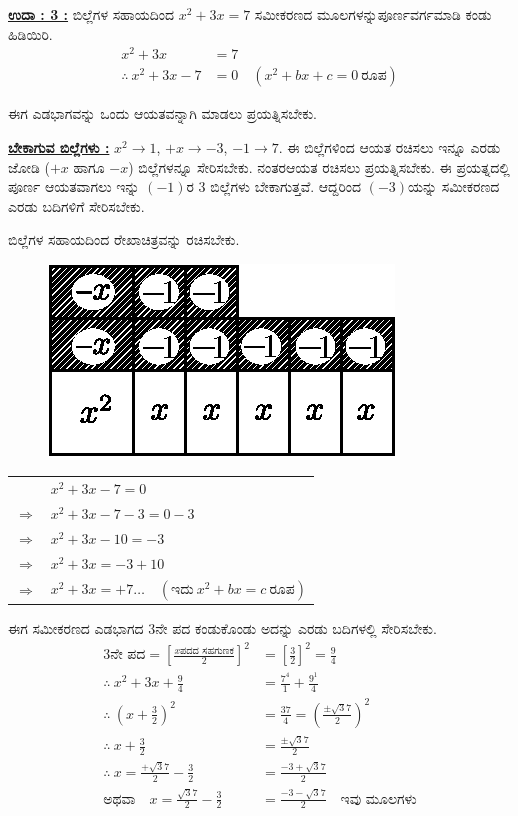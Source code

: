 \noindent
{\textbf{\underline{ಉದಾ : 3 :}}} ಬಿಲ್ಲೆಗಳ ಸಹಾಯದಿಂದ $x^2 + 3x = 7$ ಸಮೀಕರಣದ ಮೂಲಗಳನ್ನು\break ಪೂರ್ಣವರ್ಗಮಾಡಿ ಕಂಡು ಹಿಡಿಯಿರಿ. 
\begin{align*}
x^2 + 3x &= 7\\
\therefore~ x^2 + 3x - 7 & = 0 \quad (x^2 + bx + c = 0~\text{ರೂಪ})
\end{align*}

ಈಗ ಎಡಭಾಗವನ್ನು ಒಂದು ಆಯತವನ್ನಾಗಿ ಮಾಡಲು ಪ್ರಯತ್ನಿಸಬೇಕು.


\noindent
{\textbf{\underline{ಬೇಕಾಗುವ ಬಿಲ್ಲೆಗಳು :}}} $x^2 \rightarrow 1$, $+x \rightarrow -3$, $-1 \rightarrow 7$. ಈ ಬಿಲ್ಲೆಗಳಿಂದ ಆಯತ ರಚಿಸಲು ಇನ್ನೂ ಎರಡು ಜೋಡಿ ($+x$ ಹಾಗೂ $-x$) ಬಿಲ್ಲೆಗಳನ್ನೂ ಸೇರಿಸಬೇಕು. ನಂತರ\break ಆಯತ ರಚಿಸಲು ಪ್ರಯತ್ನಿಸಬೇಕು. ಈ ಪ್ರಯತ್ನದಲ್ಲಿ ಪೂರ್ಣ ಆಯತವಾಗಲು ಇನ್ನು $(-1)$ರ 3 ಬಿಲ್ಲೆಗಳು ಬೇಕಾಗುತ್ತವೆ. ಆದ್ದರಿಂದ $(-3)$ಯನ್ನು ಸಮೀಕರಣದ ಎರಡು ಬದಿಗಳಿಗೆ ಸೇರಿಸಬೇಕು.

ಬಿಲ್ಲೆಗಳ ಸಹಾಯದಿಂದ ರೇಖಾಚಿತ್ರವನ್ನು ರಚಿಸಬೇಕು.
\begin{figure}[H]
\centering
\includegraphics[scale=0.8]{src/figure/chap3/fig3-49.eps}
\end{figure} 

\begin{tabular}{ll}
& $x^2 + 3x - 7 = 0$\\
$\Rightarrow$ & $x^2 + 3x - 7 - 3 = 0 - 3$\\
$\Rightarrow$ & $x^2 + 3x - 10 = -3$\\
$\Rightarrow$ & $x^2 + 3x = -3 + 10$\\
$\Rightarrow$ & $x^2 + 3x = +7 \hdots\quad (\text{ಇದು}~ x^2 + bx = c ~\text{ರೂಪ})$
\end{tabular}

ಈಗ ಸಮೀಕರಣದ ಎಡಭಾಗದ 3ನೇ ಪದ ಕಂಡುಕೊಂಡು ಅದನ್ನು ಎರಡು ಬದಿಗಳಲ್ಲಿ ಸೇರಿಸಬೇಕು. 
\begin{align*}
3\text{ನೇ ಪದ} = \left[\frac{x\text{ಪದದ ಸಹಗುಣಕ}}{2} \right]^2 & = \left[\frac{3}{2} \right]^2 = \frac{9}{4}\\
\therefore~ x^2 + 3x + \frac{9}{4} & = \frac{7^4}{1} + \frac{9^1}{4}\\
\therefore~ \left(x + \frac{3}{2} \right)^2 & = \frac{37}{4} = \left(\frac{\pm \surd37}{2} \right)^2\\
\therefore~ x + \frac{3}{2} & = \frac{\pm \surd37}{2}\\
\therefore~ x = \frac{+ \surd 37}{2} - \frac{3}{2} & = \frac{-3 + \surd37}{2}\\
\text{ಅಥವಾ}\quad x = \frac{\surd37}{2} - \frac{3}{2} & = \frac{-3 -\surd37}{2} \quad\text{ಇವು ಮೂಲಗಳು}
\end{align*}

